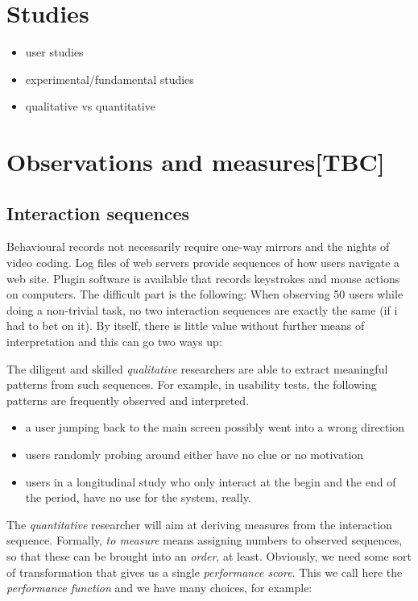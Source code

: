 \documentclass[]{svmono}
\providecommand{\tightlist}{%
  \setlength{\itemsep}{0pt}\setlength{\parskip}{0pt}}
\theoremstyle{definition}
\theoremstyle{definition}
\theoremstyle{definition}
\theoremstyle{remark}
\begin{document}
\section{Studies}\label{studies}

\begin{itemize}
\tightlist
\item
  user studies
\item
  experimental/fundamental studies
\item
  qualitative vs quantitative
\end{itemize}

\section{Observations and
measures{[}TBC{]}}\label{observations-and-measurestbc}

\subsection{Interaction sequences}\label{interaction-sequences}

Behavioural records not necessarily require one-way mirrors and the
nights of video coding. Log files of web servers provide sequences of
how users navigate a web site. Plugin software is available that records
keystrokes and mouse actions on computers. The difficult part is the
following: When observing 50 users while doing a non-trivial task, no
two interaction sequences are exactly the same (if i had to bet on it).
By itself, there is little value without further means of interpretation
and this can go two ways up:

The diligent and skilled \emph{qualitative} researchers are able to
extract meaningful patterns from such sequences. For example, in
usability tests, the following patterns are frequently observed and
interpreted.

\begin{itemize}
\tightlist
\item
  a user jumping back to the main screen possibly went into a wrong
  direction
\item
  users randomly probing around either have no clue or no motivation
\item
  users in a longitudinal study who only interact at the begin and the
  end of the period, have no use for the system, really.
\end{itemize}

The \emph{quantitative} researcher will aim at deriving measures from
the interaction sequence. Formally, \emph{to measure} means assigning
numbers to observed sequences, so that these can be brought into an
\emph{order}, at least. Obviously, we need some sort of transformation
that gives us a single \emph{performance score}. This we call here the
\emph{performance function} and we have many choices, for example:
\end{document}
